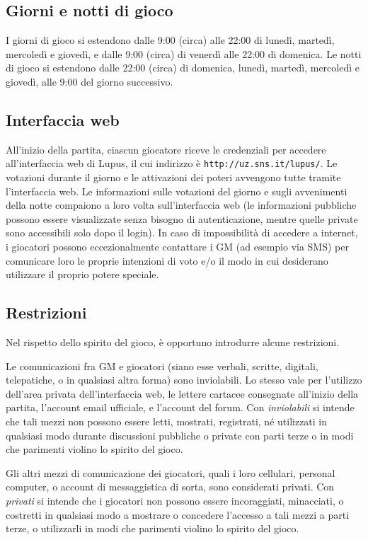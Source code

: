 \documentclass[a4paper,10pt]{article}
\begin{document}
\subsection{Giorni e notti di gioco}

I giorni di gioco si estendono dalle 9:00 (circa) alle 22:00 di lunedì, martedì, mercoledì e giovedì, e dalle 9:00 (circa) di venerdì alle 22:00 di domenica. Le notti di gioco si estendono dalle 22:00 (circa) di domenica, lunedì, martedì, mercoledì e giovedì, alle 9:00 del giorno successivo.

\subsection{Interfaccia web}

All'inizio della partita, ciascun giocatore riceve le credenziali per accedere all'interfaccia web di Lupus, il cui indirizzo è \verb|http://uz.sns.it/lupus/|.
Le votazioni durante il giorno e le attivazioni dei poteri avvengono tutte tramite l'interfaccia web. Le informazioni sulle votazioni del giorno e sugli avvenimenti della notte compaiono a loro volta sull'interfaccia web (le informazioni pubbliche possono essere visualizzate senza bisogno di autenticazione, mentre quelle private sono accessibili solo dopo il login). In caso di impossibilità di accedere a internet, i giocatori possono eccezionalmente contattare i GM (ad esempio via SMS) per comunicare loro le proprie intenzioni di voto e/o il modo in cui desiderano utilizzare il proprio potere speciale.

\subsection{Restrizioni}

Nel rispetto dello spirito del gioco, è opportuno introdurre alcune restrizioni.

Le comunicazioni fra GM e giocatori (siano esse verbali, scritte, digitali, telepatiche, o in qualsiasi altra forma) sono inviolabili. Lo stesso vale per l'utilizzo dell'area privata dell'interfaccia web, le lettere cartacee consegnate all'inizio della partita, l'account email ufficiale, e l'account del forum.
Con \emph{inviolabili} si intende che tali mezzi non possono essere letti, mostrati, registrati, né utilizzati in qualsiasi modo durante discussioni pubbliche o private con parti terze o in modi che parimenti violino lo spirito del gioco.

Gli altri mezzi di comunicazione dei giocatori, quali i loro cellulari, personal computer, o account di messaggistica di sorta, sono considerati privati.
Con \emph{privati} si intende che i giocatori non possono essere incoraggiati, minacciati, o costretti in qualsiasi modo a mostrare o concedere l'accesso a tali mezzi a parti terze, o utilizzarli in modi che parimenti violino lo spirito del gioco.
\end{document}

